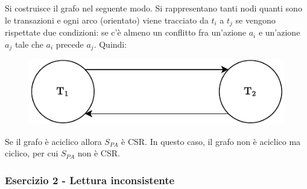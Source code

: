 \documentclass[a4paper]{article}
\begin{document}
	Si costruisce il grafo nel seguente modo. Si rappresentano tanti nodi quanti sono le transazioni e ogni arco (orientato) viene tracciato da $t_{i}$ a $t_{j}$ se vengono rispettate due condizioni: se c'è almeno un conflitto fra un'azione $a_{i}$ e un'azione $a_{j}$ tale che $a_{i}$ precede $a_{j}$. Quindi:
	\begin{figure}[!htp]
		\centering
		\includegraphics[width=.55\textwidth]{img/CSR-1.pdf}
	\end{figure}
	
	\noindent
	Se il grafo è aciclico allora $S_{PA}$ è CSR. In questo caso, il grafo non è aciclico ma ciclico, per cui $S_{PA}$ non è CSR.\newpage
	
	\subsubsection{Esercizio 2 - Lettura inconsistente}
	
\end{document}
